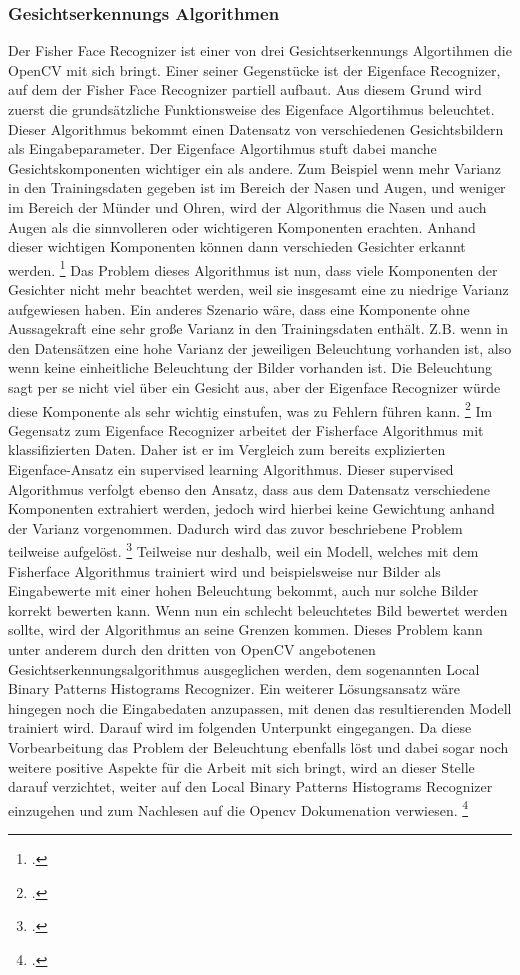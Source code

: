 \documentclass[12pt, a4paper]{report}
\begin{document}
\subsubsection{Gesichtserkennungs Algorithmen}
Der Fisher Face Recognizer ist einer von drei Gesichtserkennungs Algortihmen die OpenCV mit sich bringt. Einer seiner Gegenstücke ist der Eigenface Recognizer, auf dem der Fisher Face Recognizer partiell aufbaut. Aus diesem Grund wird zuerst die grundsätzliche Funktionsweise des Eigenface Algortihmus beleuchtet. Dieser Algorithmus bekommt einen Datensatz von verschiedenen Gesichtsbildern als Eingabeparameter. Der Eigenface Algortihmus stuft dabei manche Gesichtskomponenten wichtiger ein als andere. Zum Beispiel wenn mehr Varianz in den Trainingsdaten gegeben ist im Bereich der Nasen und Augen, und weniger im Bereich der Münder und Ohren, wird der Algorithmus die Nasen und auch Augen als die sinnvolleren oder wichtigeren Komponenten erachten. Anhand dieser wichtigen Komponenten können dann verschieden Gesichter erkannt werden.
\footcite[Vgl.][]{Eigenface}
Das Problem dieses Algorithmus ist nun, dass viele Komponenten der Gesichter nicht mehr beachtet werden, weil sie insgesamt eine zu niedrige Varianz aufgewiesen haben. Ein anderes Szenario wäre, dass eine Komponente ohne Aussagekraft eine sehr große Varianz in den Trainingsdaten enthält. Z.B. wenn in den Datensätzen eine hohe Varianz der jeweiligen Beleuchtung vorhanden ist, also wenn keine einheitliche Beleuchtung der Bilder vorhanden ist. Die Beleuchtung sagt per se nicht viel über ein Gesicht aus, aber der Eigenface Recognizer würde diese Komponente als sehr wichtig einstufen, was zu Fehlern führen kann.
\footcite[Vgl.][]{Fisherface}
Im Gegensatz zum Eigenface Recognizer arbeitet der Fisherface Algorithmus mit klassifizierten Daten. Daher ist er im Vergleich zum bereits explizierten Eigenface-Ansatz ein supervised learning Algorithmus. Dieser supervised Algorithmus verfolgt ebenso den Ansatz, dass aus dem Datensatz verschiedene Komponenten extrahiert werden, jedoch wird hierbei keine Gewichtung anhand der Varianz vorgenommen. Dadurch wird das zuvor beschriebene Problem teilweise aufgelöst. 
\footcite[Vgl.][How to fix this issue]{Eigenface}
Teilweise nur deshalb, weil ein Modell, welches mit dem Fisherface Algorithmus trainiert wird und beispielsweise nur Bilder als Eingabewerte mit einer hohen Beleuchtung bekommt, auch nur solche Bilder korrekt bewerten kann. Wenn nun ein schlecht beleuchtetes Bild bewertet werden sollte, wird der Algorithmus an seine Grenzen kommen.
Dieses Problem kann unter anderem durch den dritten von OpenCV angebotenen Gesichtserkennungsalgorithmus ausgeglichen werden, dem sogenannten Local Binary Patterns Histograms Recognizer. Ein weiterer Lösungsansatz wäre hingegen noch die Eingabedaten anzupassen, mit denen das resultierenden Modell trainiert wird. Darauf wird im folgenden Unterpunkt \pageref{subsec: Eingabe Daten} eingegangen. Da diese Vorbearbeitung das Problem der Beleuchtung ebenfalls löst und dabei sogar noch weitere positive Aspekte für die Arbeit mit sich bringt, wird an dieser Stelle darauf verzichtet, weiter auf den Local Binary Patterns Histograms Recognizer einzugehen und zum Nachlesen auf die Opencv Dokumenation verwiesen. 
\footcite[Vgl.][]{Recognizer} 
\end{document}
